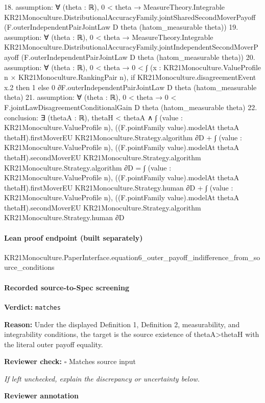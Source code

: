 \documentclass[10pt]{article}
\newcommand{\reviewerbox}{%
  \par\noindent\fbox{\parbox{0.96\linewidth}{\rule{0pt}{0.38in}}}\par
}
\newcommand{\reviewmatch}[1]{%
  \par\noindent\textbf{Reviewer check:} $\square$\; #1\par
  \noindent\emph{If left unchecked, explain the discrepancy or uncertainty below.}\par
}
\begin{document}
\begin{ReviewVerbatim}
18. assumption: ∀ (theta : ℝ),
  0 < theta →
    MeasureTheory.Integrable KR21Monoculture.DistributionalAccuracyFamily.jointSharedSecondMoverPayoff
      (F.outerIndependentPairJointLaw D theta (hatom_measurable theta))
19. assumption: ∀ (theta : ℝ),
  0 < theta →
    MeasureTheory.Integrable KR21Monoculture.DistributionalAccuracyFamily.jointIndependentSecondMoverPayoff
      (F.outerIndependentPairJointLaw D theta (hatom_measurable theta))
20. assumption: ∀ (theta : ℝ),
  0 < theta →
    0 <
      ∫ (x : KR21Monoculture.ValueProfile n × KR21Monoculture.RankingPair n),
        if KR21Monoculture.disagreementEvent x.2 then 1
        else 0 ∂F.outerIndependentPairJointLaw D theta (hatom_measurable theta)
21. assumption: ∀ (theta : ℝ), 0 < theta → 0 < F.jointLawDisagreementConditionalGain D theta (hatom_measurable theta)
22. conclusion: ∃ (thetaA : ℝ),
  thetaH < thetaA ∧
    ∫ (value : KR21Monoculture.ValueProfile n),
          ((F.pointFamily value).modelAt thetaA thetaH).firstMoverEU KR21Monoculture.Strategy.algorithm ∂D +
        ∫ (value : KR21Monoculture.ValueProfile n),
          ((F.pointFamily value).modelAt thetaA thetaH).secondMoverEU KR21Monoculture.Strategy.algorithm
            KR21Monoculture.Strategy.algorithm ∂D =
      ∫ (value : KR21Monoculture.ValueProfile n),
          ((F.pointFamily value).modelAt thetaA thetaH).firstMoverEU KR21Monoculture.Strategy.human ∂D +
        ∫ (value : KR21Monoculture.ValueProfile n),
          ((F.pointFamily value).modelAt thetaA thetaH).secondMoverEU KR21Monoculture.Strategy.algorithm
            KR21Monoculture.Strategy.human ∂D
\end{ReviewVerbatim}

\paragraph{Lean proof endpoint (built separately)}\begin{ReviewVerbatim}
KR21Monoculture.PaperInterface.equation6_outer_payoff_indifference_from_source_conditions
\end{ReviewVerbatim}

\paragraph{Recorded source-to-Spec screening}
\textbf{Verdict:} \texttt{matches}
\\
{\raggedright
\textbf{Reason:} Under the displayed Definition 1, Definition 2, measurability, and integrability conditions, the target is the source existence of thetaA>thetaH with the literal outer payoff equality.\allowbreak{}
\par}
\reviewmatch{Matches source input}
\noindent\textbf{Reviewer annotation}\par
\reviewerbox
\clearpage
\hypertarget{source-claim-cc8111af16950cc8}{}
\end{document}
